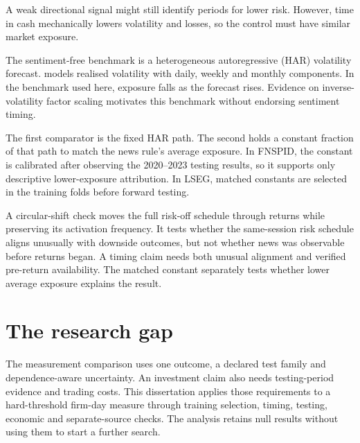 A weak directional signal might still identify periods for lower risk. However,
time in cash mechanically lowers volatility and losses, so the control must have
similar market exposure.

The sentiment-free benchmark is a heterogeneous autoregressive (HAR) volatility
forecast. \citet{corsi2009har} models realised volatility with daily, weekly and
monthly components. In the benchmark used here, exposure falls as the forecast
rises. Evidence on inverse-volatility factor scaling \citep{moreira2017}
motivates this benchmark without endorsing sentiment timing.

The first comparator is the fixed HAR path. The second holds a constant
fraction of that path to match the news rule's average exposure. In FNSPID, the
constant is calibrated after observing the 2020--2023 testing results, so it supports only
descriptive lower-exposure attribution. In LSEG, matched constants are selected
in the training folds before forward testing.

A circular-shift check moves the full risk-off schedule through returns while
preserving its activation frequency. It tests whether the same-session risk
schedule aligns unusually with downside outcomes, but not whether news was
observable before returns began. A timing claim needs both unusual alignment
and verified pre-return availability. The matched constant separately tests
whether lower average exposure explains the result.

\section{The research gap}

The measurement comparison uses one outcome, a declared test family and
dependence-aware uncertainty. An investment claim also needs testing-period
evidence and trading costs. This dissertation applies those requirements to a
hard-threshold firm-day measure through training selection, timing, testing,
economic and separate-source checks. The analysis retains null results without
using them to start a further search.

